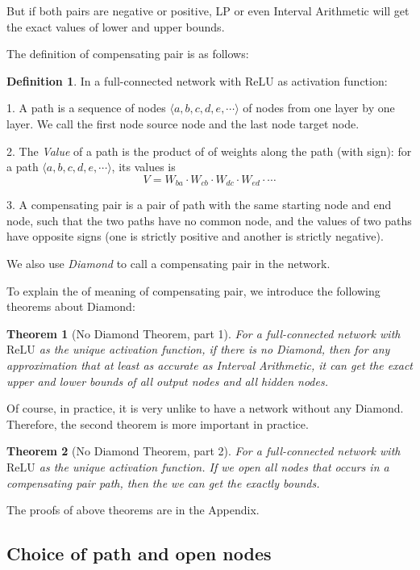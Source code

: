 \documentclass[8pt]{article}
\newtheorem{theorem}{Theorem}
\theoremstyle{definition}
\newtheorem{definition}{Definition}
\newcommand{\ReLU}{\mathrm{ReLU}}
\begin{document}
But if both pairs are negative or positive, LP or even Interval Arithmetic will get the exact values of lower and upper bounds.

The definition of compensating pair is as follows:

\begin{definition} In a full-connected network with $\ReLU$ as activation function:
	
	1. A path is a sequence of nodes $\langle a,b,c,d,e,\cdots\rangle$ of nodes from one layer by one layer. We call the first node source node and the last node target node.  
	
	2. The \emph{Value} of a path is the product of of weights along the path (with sign): for a path $\langle a,b,c,d,e,\cdots\rangle$, its values is $$V = W_{ba}\cdot W_{cb}\cdot W_{dc}\cdot W_{ed}\cdot \cdots$$
	
	3. A compensating pair is a pair of path with the same starting node and end node, such that the two paths have no common node, and the values of two paths have opposite signs (one is strictly positive and another is strictly negative).
	
	We also use \emph{Diamond} to call a compensating pair in the network.
\end{definition}


To explain the of meaning of compensating pair, we introduce the following theorems about Diamond:

\begin{theorem}[No Diamond Theorem, part 1]
	For a full-connected network with $\ReLU$ as the unique activation function, if there is no Diamond, then for any approximation that at least as accurate as Interval Arithmetic, it can get the exact upper and lower bounds of all output nodes and all hidden nodes.
\end{theorem}

Of course, in practice, it is very unlike to have a network without any Diamond. Therefore, the second theorem is more important in practice.

\begin{theorem}[No Diamond Theorem, part 2]
	For a full-connected network with $\ReLU$ as the unique activation function. If we open all nodes that occurs in a compensating pair path, then the we can get the exactly bounds.
\end{theorem}

The proofs of above theorems are in the Appendix.

\subsection{Choice of path and open nodes}
\end{document}

